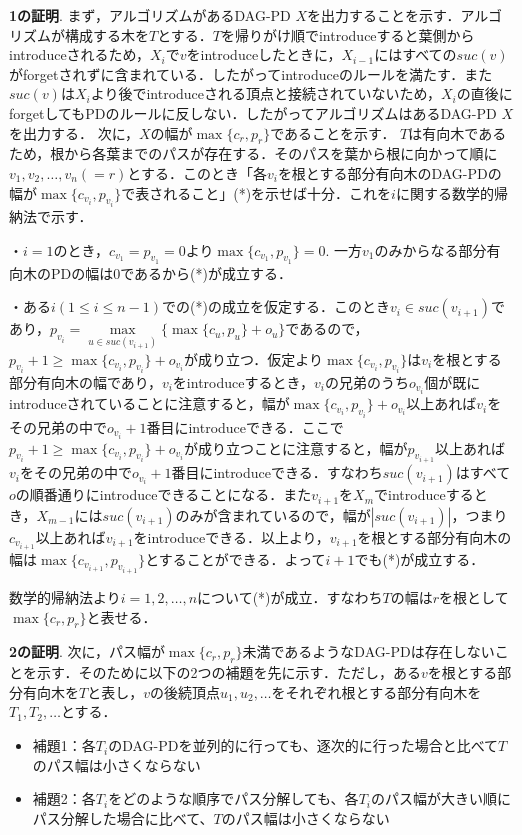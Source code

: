 \documentclass{kuisthesis}           %
\begin{document}
 \textbf{1の証明}.
 まず，アルゴリズムがあるDAG-PD $X$を出力することを示す．アルゴリズムが構成する木を$T$とする．$T$を帰りがけ順でintroduceすると葉側からintroduceされるため，$X_i$で$v$をintroduceしたときに，$X_{i-1}$にはすべての$suc(v)$がforgetされずに含まれている．したがってintroduceのルールを満たす．また$suc(v)$は$X_i$より後でintroduceされる頂点と接続されていないため，$X_i$の直後にforgetしてもPDのルールに反しない．したがってアルゴリズムはあるDAG-PD $X$を出力する．
 次に，$X$の幅が$ \max\{c_r, p_r\}$であることを示す． $T$は有向木であるため，根から各葉までのパスが存在する．そのパスを葉から根に向かって順に$v_1, v_2,   \ldots, v_n(=r)$とする．このとき「各$v_i$を根とする部分有向木のDAG-PDの幅が$ \max\{c_{v_i}, p_{v_i}\}$で表されること」(*)を示せば十分．これを$i$に関する数学的帰納法で示す．
 
・$i=1$のとき，$c_{v_1}=p_{v_1}=0$より$ \max\{c_{v_1}, p_{v_1}\}=0$. 一方$v_1$のみからなる部分有向木のPDの幅は0であるから(*)が成立する．

・ある$i(1 \leq i \leq n-1)$での(*)の成立を仮定する．このとき$v_i \in suc(v_{i+1})$であり，$p_{v_i}= \underset{u \in suc(v_{i+1})}{\max}\{ \max\{c_u, p_u\}+o_u\}$であるので，$p_{v_i}+1 \geq  \max\{c_{v_i}, p_{v_i}\}+o_{v_i}$が成り立つ．仮定より$ \max\{c_{v_i}, p_{v_i}\}$は$v_i$を根とする部分有向木の幅であり，$v_i$をintroduceするとき，$v_i$の兄弟のうち$o_{v_i}$個が既にintroduceされていることに注意すると，幅が$ \max\{c_{v_i}, p_{v_i}\}+o_{v_i}$以上あれば$v_i$をその兄弟の中で$o_{v_i}+1$番目にintroduceできる．ここで$p_{v_i}+1 \geq  \max\{c_{v_i}, p_{v_i}\}+o_{v_i}$が成り立つことに注意すると，幅が$p_{v_{i+1}}$以上あれば$v_i$をその兄弟の中で$o_{v_i}+1$番目にintroduceできる．すなわち$suc(v_{i+1})$はすべて$o$の順番通りにintroduceできることになる．また$v_{i+1}$を$X_m$でintroduceするとき，$X_{m-1}$には$suc(v_{i+1})$のみが含まれているので，幅が$|suc(v_{i+1})|$，つまり$c_{v_{i+1}}$以上あれば$v_{i+1}$をintroduceできる．以上より，$v_{i+1}$を根とする部分有向木の幅は$ \max\{c_{v_{i+1}}, p_{v_{i+1}}\}$とすることができる．よって$i+1$でも(*)が成立する．

数学的帰納法より$i=1, 2,   \ldots, n$について(*)が成立．すなわち$T$の幅は$r$を根として$ \max\{c_r, p_r\}$と表せる．

 \textbf{2の証明}.
 次に，パス幅が$ \max\{c_r, p_r\}$未満であるようなDAG-PDは存在しないことを示す．そのために以下の2つの補題を先に示す．ただし，ある$v$を根とする部分有向木を$T$と表し，$v$の後続頂点$u_1, u_2,  \ldots $をそれぞれ根とする部分有向木を$T_1, T_2,  \ldots $とする．


 \begin{itemize}
  \item 補題1：各$T_i$のDAG-PDを並列的に行っても、逐次的に行った場合と比べて$T$のパス幅は小さくならない
  \item 補題2：各$T_i$をどのような順序でパス分解しても、各$T_i$のパス幅が大きい順にパス分解した場合に比べて、$T$のパス幅は小さくならない
 \end{itemize}
\end{document}
